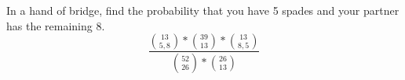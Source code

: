 \item In a hand of bridge, find the probability that you have 5 spades and your partner has the remaining 8.
\[ \frac{\binom{13}{5,8} * \binom{39}{13} * \binom{13}{8,5}}{\binom{52}{26} * \binom{26}{13}} \]
